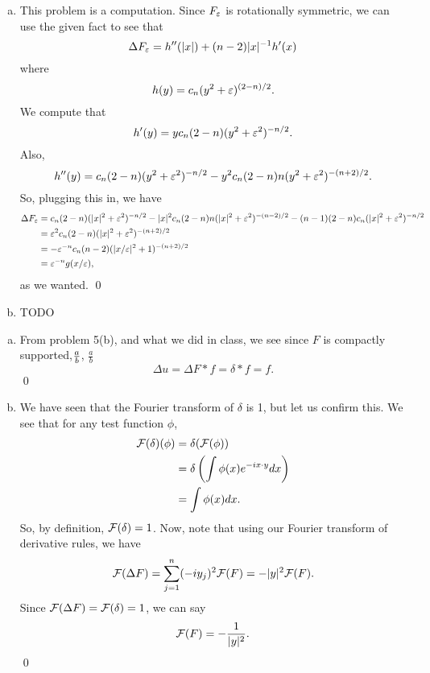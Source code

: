 \documentclass{article}
\begin{document}
\newpage
{} 
 \tri
\hop 
\solution
\begin{enumerate}[(a)]
    \item This problem is a computation. Since $F_\varepsilon$ is rotationally symmetric, we can use the given fact to see that 
    \[\Delta F_\varepsilon = h''(|x|) + (n-2)|x|{^{-1}} h'(x)\]
    where 
    \[h(y) = c_n(y^2+\varepsilon)^{(2-n)/2}.\]
    We compute that 
    \[h'(y) = yc_n(2-n)(y^2+\varepsilon^2)^{-n/2}.\]
    Also, 
    \[h''(y) = c_n(2-n)(y^2+\varepsilon^2)^{-n/2} - y^2c_n(2-n)n(y^2+\varepsilon^2)^{-(n+2)/2}.\]
    So, plugging this in, we have 
    \begin{align*}
        \Delta F_\varepsilon &= c_n (2-n)(|x|^2+\varepsilon^2)^{-n/2}- |x|^2c_n(2-n)n(|x|^2+\varepsilon^2)^{-(n-2)/2} - (n-1)(2-n)c_n(|x|^2 + \varepsilon^2)^{-n/2}\\
        &=\varepsilon^2 c_n(2-n)(|x|^2 + \varepsilon^2)^{-(n+2)/2}\\
        &=-\varepsilon^{-n} c_n(n-2)(|x/\varepsilon|^2 + 1)^{-(n+2)/2}\\
        &= \varepsilon^{-n}g(x/\varepsilon),
    \end{align*}
    as we wanted. \qed
    \item TODO
\end{enumerate}

\newpage
{} 
 \tri
\hop 
\solution
\begin{enumerate}[(a)]
    \item From problem 5(b), and what we did in class, we see since $F$ is compactly supported,$a \over b$, $\frac{a}{b}$
    \[\Delta u = \Delta F * f = \delta * f  = f.\]
    \qed
    \item We have seen that the Fourier transform of $\delta$ is 1, but let us confirm this. We see that for any test function $\phi$, 
    \begin{align*}
        \F(\delta)(\phi) &= \delta(\F(\phi)) \\
        &= \delta\del{\int \phi(x)e^{-ix\cdot y}dx}\\
        &= \int \phi(x)dx.
    \end{align*}
    So, by definition, $\mathcal{F}(\delta) = 1$.
    \hop 
    Now, note that using our Fourier transform of derivative rules, we have 
    \[\mathcal{F}(\Delta F) = \sum_{j=1}^n (-iy_j)^2 \mathcal{F}(F) = -|y|^2\mathcal{F}(F).\]
    Since $\mathcal{F}(\Delta F) = \mathcal{F}(\delta) = 1$, we can say 
    \[\mathcal{F}(F) = -\frac{1}{|y|^2}.\]
    \qed
\end{enumerate}
\end{document}
